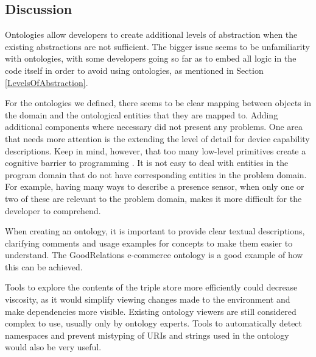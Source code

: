 
\subsection{Discussion}


Ontologies allow developers to create additional levels of abstraction when the existing abstractions are not sufficient. The bigger issue seems to be unfamiliarity with ontologies, with some developers going so far as to embed all logic in the code itself in order to avoid using ontologies, as mentioned in Section \ref{LevelsOfAbstraction}.

For the ontologies we defined, there seems to be clear mapping between objects in the domain and the ontological entities that they are mapped to. Adding additional components where necessary did not present any problems. One area that needs more attention is the extending the level of detail for device capability descriptions. Keep in mind, however, that too many low-level primitives create a cognitive barrier to programming \cite{Green1996}. It is not easy to deal with entities in the program domain that do not have corresponding entities in the problem domain. For example, having many ways to describe a presence sensor, when only one or two of these are relevant to the problem domain, makes it more difficult for the developer to comprehend.

When creating an ontology, it is important to provide clear textual descriptions, clarifying comments and usage examples for concepts to make them easier to understand. The GoodRelations e-commerce ontology is a good example of how this can be achieved.

Tools to explore the contents of the triple store more efficiently could decrease viscosity, as it would simplify viewing changes made to the environment and make dependencies more visible. Existing ontology viewers are still considered complex to use, usually only by ontology experts. Tools to automatically detect namespaces and prevent mistyping of \acp{URI} and strings used in the ontology would also be very useful.

